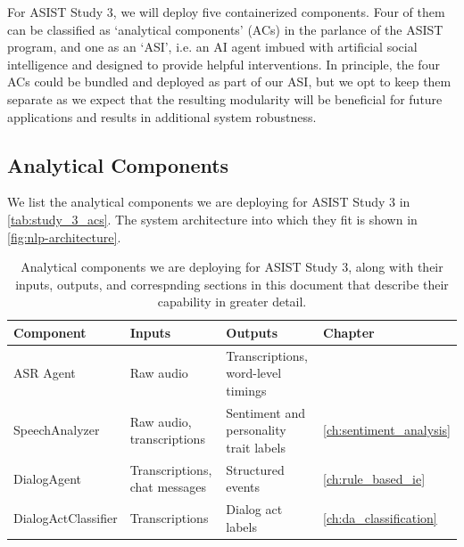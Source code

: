 For ASIST Study 3, we will deploy five containerized components. Four of them
can be classified as `analytical components' (ACs) in the parlance of the ASIST
program, and one as an `ASI', i.e. an AI agent imbued with artificial social
intelligence and designed to provide helpful interventions. In principle, the
four ACs could be bundled and deployed as part of our ASI, but we opt to keep
them separate as we expect that the resulting modularity will be beneficial for
future applications and results in additional system robustness.


\subsection{Analytical Components}

We list the analytical components we are deploying for ASIST Study 3 in
\autoref{tab:study_3_acs}. The system architecture into which they fit is shown
in \autoref{fig:nlp-architecture}.

\begin{table}
    \small
    \begin{tabularx}{5.5in}{llXl}
        \toprule
        Component           & Inputs                        & Outputs                                & Chapter\\\midrule
        ASR Agent           & Raw audio                     & Transcriptions, word-level timings     & \\
        SpeechAnalyzer      & Raw audio, transcriptions     & Sentiment and personality trait labels & \autoref{ch:sentiment_analysis}\\
        DialogAgent         & Transcriptions, chat messages & Structured events                      & \autoref{ch:rule_based_ie}\\
        DialogActClassifier & Transcriptions                & Dialog act labels                      & \autoref{ch:da_classification}\\
        \bottomrule
    \end{tabularx}
    \caption{%
        Analytical components we are deploying for ASIST Study 3, along with
        their inputs, outputs, and correspnding sections in this document that
        describe their capability in greater detail.
    }
    \label{tab:study_3_acs}
\end{table}


